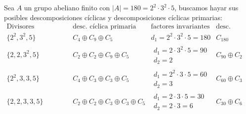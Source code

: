 \begin{ejemplo}
    Sea $A$ un grupo abeliano finito con $|A| = 180 = 2^2\cdot 3^2\cdot 5$, buscamos hayar sus posibles descomposiciones cíclicas y descomposiciones cíclicas primarias:
    \begin{equation*}
        \begin{array}{c|c|c|c}
            \text{Divisores elementales} & \text{desc. cíclica primaria} & \text{factores invariantes} & \text{desc. cíclica} \\
            \hline
            \{2^2, 3^2, 5\} & C_4\oplus C_9 \oplus C_5 & d_1= 2^2\cdot 3^2\cdot 5 = 180 & C_{180} \\
            \hline
            \{2,2,3^2,5\} & C_2\oplus C_2\oplus C_9\oplus C_5 & \begin{array}{c}
                    d_1 = 2\cdot 3^2\cdot 5 = 90 \\
                    d_2 = 2
            \end{array}& C_{90}\oplus C_2 \\
            \hline
            \{2^2, 3, 3, 5\} & C_4\oplus C_3\oplus C_3\oplus C_5 & \begin{array}{c}
                    d_1 = 2^2\cdot 3\cdot 5 = 60 \\
                    d_2 = 3
            \end{array}& C_{60} \oplus C_3 \\
            \hline
                    \{2,2,3,3,5\} & C_2\oplus C_2\oplus C_3\oplus C_3\oplus C_5 & \begin{array}{c}
                            d_1 = 2\cdot 3\cdot 5 = 30 \\
                            d_2 = 2\cdot 3 = 6
                        \end{array} & C_{30} \oplus C_6
        \end{array}
    \end{equation*}
\end{ejemplo}

